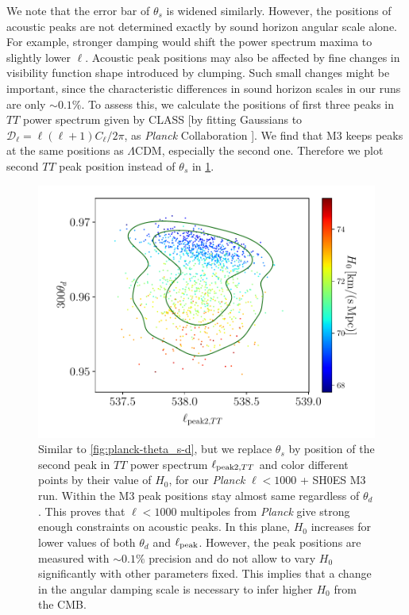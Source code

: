 We note that the error bar of $\theta_s$ is widened similarly.
However, the positions of acoustic peaks are not determined exactly by sound horizon angular scale alone.
For example, stronger damping would shift the power spectrum maxima to slightly lower $\ell$.
Acoustic peak positions may also be affected by fine changes in visibility function shape introduced by clumping.
Such small changes might be important, since the characteristic differences in sound horizon scales in our runs are only $\sim 0.1\%$.
To assess this, we calculate the positions of first three peaks in $TT$ power spectrum given by CLASS [by fitting Gaussians to $\mathcal{D}_\ell=\ell(\ell+1)C_\ell/2\pi$, as {\it Planck} Collaboration \citep{planck_overview}].
We find that M3 keeps peaks at the same positions as $\Lambda$CDM, especially the second one.
Therefore we plot second $TT$ peak position instead of $\theta_s$ in \cref{fig:planck-SH0ES-lowl-ell_peak2-theta_d-H0}.

\begin{figure}[ht!]
\includegraphics[width=\columnwidth]{img/planck-SH0ES-lowl-ell_peak2-theta_d-H0.pdf}
\caption[Position of the second peak in the CMB temperature power spectrum vs. damping angular scale for {\it Planck} $\ell<1000$ + SH0ES]{Similar to \cref{fig:planck-theta_s-d}, but we replace $\theta_s$ by position of the second peak in $TT$ power spectrum $\ell_{{\rm peak2},TT}$ and color different points by their value of $H_0$, for our {\it Planck} $\ell<1000$ + SH0ES M3 run.
Within the M3 peak positions stay almost same regardless of $\theta_d$.
This proves that $\ell<1000$ multipoles from {\it Planck} give strong enough constraints on acoustic peaks.
In this plane, $H_0$ increases for lower values of both $\theta_d$ and $\ell_{\rm peak}$.
However, the peak positions are measured with $\sim 0.1\%$ precision and do not allow to vary $H_0$ significantly with other parameters fixed.
This implies that a change in the angular damping scale is necessary to infer higher $H_0$ from the CMB.}
\label{fig:planck-SH0ES-lowl-ell_peak2-theta_d-H0}
\end{figure}

